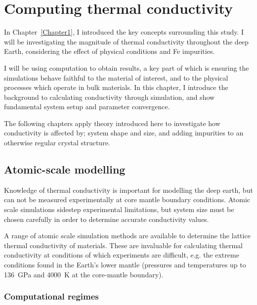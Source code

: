 \chapter{Computing thermal conductivity} 

\label{Chapter2} 

In Chapter~\ref{Chapter1}, I introduced the key concepts surrounding this study. I will be investigating the magnitude of thermal conductivity throughout the deep Earth, considering the effect of physical conditions and Fe impurities. 

I will be using computation to obtain results, a key part of which is ensuring the simulations behave faithful to the material of interest, and to the physical processes which operate in bulk materials. In this chapter, I introduce the background to calculating conductivity through simulation, and show fundamental system setup and parameter convergence. 

The following chapters apply theory introduced here to investigate how conductivity is affected by; system shape and size, and adding impurities to an otherwise regular crystal structure.

\section{Atomic-scale modelling}

Knowledge of thermal conductivity is important for modelling the deep earth, but can not be measured experimentally at core mantle boundary conditions. Atomic scale simulations sidestep experimental limitations, but system size must be chosen carefully in order to determine accurate conductivity values. 

A range of atomic scale simulation methods are available to determine the lattice thermal conductivity of materials. These are invaluable for calculating thermal conductivity at conditions of which experiments are difficult, e.g. the extreme conditions found in the Earth's lower mantle (pressures and temperatures up to 136~GPa and 4000~K at the core-mantle boundary). 

\subsection{Computational regimes}

